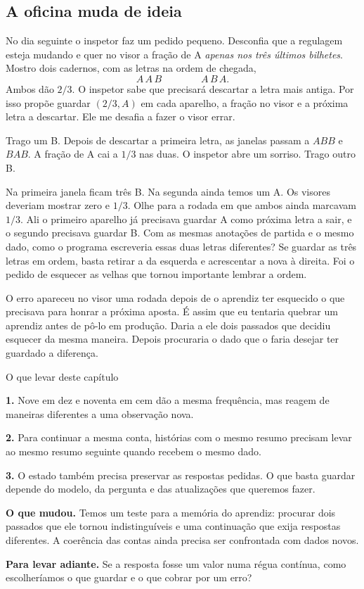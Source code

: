 \documentclass[12pt,oneside]{article}
\newcommand{\secao}[1]{\Needspace{5.2\baselineskip}\subsection*{#1}}
\newcommand{\itemq}[1]{\par\textbf{#1.}\enspace}
\newcommand{\bookanchor}[1]{\phantomsection\label{#1}}
\begin{document}
\secao{A oficina muda de ideia}
No\bookanchor{topic-07-4} dia seguinte o inspetor faz um pedido pequeno. Desconfia que a regulagem esteja mudando e quer no visor a fração de A \emph{apenas nos três últimos bilhetes}. Mostro dois cadernos, com as letras na ordem de chegada,
\[
                           A\,A\,B \qquad\qquad A\,B\,A .
\]
Ambos dão $2/3$. O inspetor sabe que precisará descartar a letra mais antiga. Por isso propõe guardar $(2/3,A)$ em cada aparelho, a fração no visor e a próxima letra a descartar. Ele me desafia a fazer o visor errar.

Trago um B. Depois de descartar a primeira letra, as janelas passam a $ABB$ e $BAB$. A fração de A cai a $1/3$ nas duas. O inspetor abre um sorriso. Trago outro B.

Na primeira janela ficam três B. Na segunda ainda temos um A. Os visores deveriam mostrar zero e $1/3$. Olhe para a rodada em que ambos ainda marcavam $1/3$. Ali o primeiro aparelho já precisava guardar A como próxima letra a sair, e o segundo precisava guardar B. Com as mesmas anotações de partida e o mesmo dado, como o programa escreveria essas duas letras diferentes? Se guardar as três letras em ordem, basta retirar a da esquerda e acrescentar a nova à direita. Foi o pedido de esquecer as velhas que tornou importante lembrar a ordem.

O erro apareceu no visor uma rodada depois de o aprendiz ter esquecido o que precisava para honrar a próxima aposta. É assim que eu tentaria quebrar um aprendiz antes de pô-lo em produção. Daria a ele dois passados que decidiu esquecer da mesma maneira. Depois procuraria o dado que o faria desejar ter guardado a diferença.

\begin{quadro}{O que levar deste capítulo}
\itemq{1} Nove em dez e noventa em cem dão a mesma frequência, mas reagem de maneiras diferentes a uma observação nova.
\itemq{2} Para continuar a mesma conta, histórias com o mesmo resumo precisam levar ao mesmo resumo seguinte quando recebem o mesmo dado.
\itemq{3} O estado também precisa preservar as respostas pedidas. O que basta guardar depende do modelo, da pergunta e das atualizações que queremos fazer.
\itemq{O que mudou} Temos um teste para a memória do aprendiz: procurar dois passados que ele tornou indistinguíveis e uma continuação que exija respostas diferentes. A coerência das contas ainda precisa ser confrontada com dados novos.
\itemq{Para levar adiante} Se a resposta fosse um valor numa régua contínua, como escolheríamos o que guardar e o que cobrar por um erro?
\end{quadro}
\end{document}
